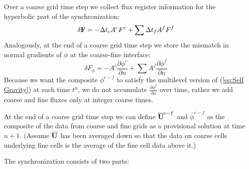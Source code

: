 Over a coarse grid time step we collect flux register information for
the hyperbolic part of the synchronization:
\begin{equation}
\delta{\bf F} = -\Delta t_c A^c F^c + \sum \Delta t_f A^f F^f
\end{equation}
Analogously, at the end of a coarse grid time step we store the
mismatch in normal gradients of $\phi$ at the coarse-fine interface:
\begin{equation}
\delta F_\phi =  - A^c \frac{\partial \phi^c}{\partial n}
+ \sum A^f \frac{\partial \phi^f}{\partial n}
\end{equation}
Because we want the composite $\phi^{c-f}$ to satisfy the multilevel
version of (\ref{eq:Self Gravity}) at each time $t^n$, we do not
accumulate $\frac{\partial \phi^f}{\partial n}$ over time, rather we
add coarse and fine fluxes only at integer coarse times.

At the end of a coarse grid time step we can define
${\overline{{\bf U}}}^{c-f}$ and $\overline{\phi}^{c-f}$ as the composite
of the data from coarse and fine grids as a provisional solution at
time $n+1$. (Assume $\overline{{\bf U}}$ has been averaged down so that
the data on coarse cells underlying fine cells is the average of the
fine cell data above it.)

The synchronization consists of two parts: 

